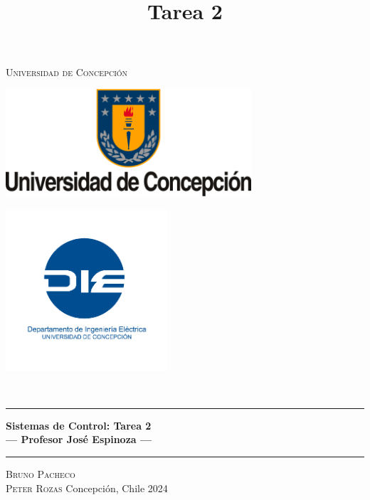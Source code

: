 \title{{\Large \\ Tarea 2 \\[0.1 cm]}}

\pagestyle{fancy}
\fancyhf{}
\lhead{\thetitle}
\cfoot{\thepage}

\begin{titlepage}
    \newcommand{\drop}{0.1\textheight}
    \newcommand{\halfdrop}{0.05\textheight}
    \vspace*{\drop}
    \begin{center}
    {\LARGE\textsc{Universidad de Concepción}}\\[\drop]
    \begin{minipage}{0.47\linewidth}
        \centering
        {\includegraphics[height=4cm]{extras/logo_udec.png}}
    \end{minipage}
    \begin{minipage}{0.47\linewidth}  %
        \centering
        {\includegraphics[height=6cm]{extras/logo_die.png}}
    \end{minipage}\\[\halfdrop]
    \rule{\textwidth}{1pt}\par
    \vspace{0.5\baselineskip}
    {\huge\bfseries Sistemas de Control: Tarea 2\\
    \large --- Profesor José Espinoza ---}\\[0.5\baselineskip]
    \rule{\textwidth}{1pt}\par
    \vfill
    {\Large\textsc{Bruno Pacheco \\ Peter Rozas}}
    \vfill
    Concepción, Chile
    \vfill
    {\large 2024}
    \end{center}
\end{titlepage}

\fancyfoot[C]{\thepage}  %
\renewcommand{\footrulewidth}{0.4pt}
